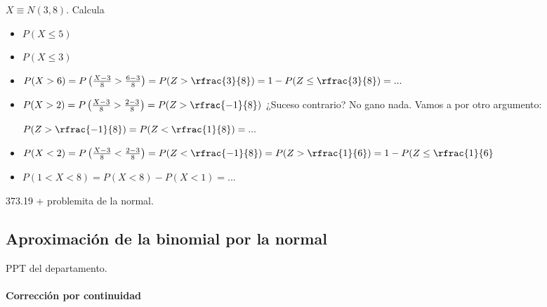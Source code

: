 \begin{example} $X\equiv N(3,8)$. Calcula
\begin{itemize}
    \item $P(X\leq 5)$
    \item $P(X\leq 3)$
    \item $P(X>6) = P\left(\frac{X-3}{8} > \frac{6-3}{8}\right) = P(Z>\rfrac{3}{8}) = 1-P(Z\leq\rfrac{3}{8}) = ... $
    \item $P(X>2) = P\left(\frac{X-3}{8} > \frac{2-3}{8}\right) = P(Z>\rfrac{-1}{8})$ ¿Suceso contrario? No gano nada. Vamos a por otro argumento: 
    
    $P(Z>\rfrac{-1}{8}) = P(Z<\rfrac{1}{8}) = ...$
    \item $P(X<2) =  P\left(\frac{X-3}{8} < \frac{2-3}{8}\right) = P(Z<\rfrac{-1}{8}) = P(Z>\rfrac{1}{6}) = 1-P(Z\leq \rfrac{1}{6}
    $
    \item $P(1<X<8) = P(X<8) - P(X<1) = ...$
\end{itemize}
373.19 + problemita de la normal.

\subsection{Aproximación de la binomial por la normal}
PPT del departamento.

\paragraph{Corrección por continuidad}

\end{example}
